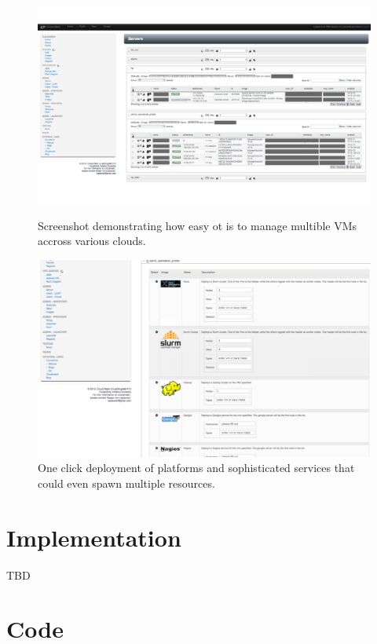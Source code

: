 \documentclass{tex/sig-alternate-2013}
\begin{document}
{\begin{figure}[htb]
  \centering
    \includegraphics[width=1.0\columnwidth]{images/instances.pdf}
  \caption{Screenshot demonstrating how easy ot is to manage multible VMs accross various clouds.}\label{F:instances}
  \centering
    \includegraphics[width=1.0\columnwidth]{images/oneclick.pdf}
  \caption{One click deployment of platforms and sophisticated
    services that could even spawn multiple resources.}\label{F:oneclick}
\end{figure}


\section{Implementation}\label{S:implementation}

TBD


\section{Code}

}
\end{document}

